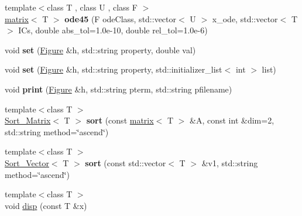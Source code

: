 \begin{DoxyCompactItemize}
\item 
\hypertarget{namespacekeycpp_a880f7df231a78f912b3fb5d301c809f9}{{\footnotesize template$<$class T , class U , class F $>$ }\\\hyperlink{classkeycpp_1_1matrix}{matrix}$<$ T $>$ {\bfseries ode45} (F ode\-Class, std\-::vector$<$ U $>$ x\-\_\-ode, std\-::vector$<$ T $>$ I\-Cs, double abs\-\_\-tol=1.\-0e-\/10, double rel\-\_\-tol=1.\-0e-\/6)}\label{namespacekeycpp_a880f7df231a78f912b3fb5d301c809f9}

\item 
\hypertarget{namespacekeycpp_afcd6ae07fc18f5374868fe314f00108c}{void {\bfseries set} (\hyperlink{classkeycpp_1_1_figure}{Figure} \&h, std\-::string property, double val)}\label{namespacekeycpp_afcd6ae07fc18f5374868fe314f00108c}

\item 
\hypertarget{namespacekeycpp_a261a9d83dcc8786777d193575b7e1a1c}{void {\bfseries set} (\hyperlink{classkeycpp_1_1_figure}{Figure} \&h, std\-::string property, std\-::initializer\-\_\-list$<$ int $>$ list)}\label{namespacekeycpp_a261a9d83dcc8786777d193575b7e1a1c}

\item 
\hypertarget{namespacekeycpp_af9dec3da4533a1db21a6c6c4fe8e740a}{void {\bfseries print} (\hyperlink{classkeycpp_1_1_figure}{Figure} \&h, std\-::string pterm, std\-::string pfilename)}\label{namespacekeycpp_af9dec3da4533a1db21a6c6c4fe8e740a}

\item 
\hypertarget{namespacekeycpp_aa2641f24e5cec5eddddbd6de2159055f}{{\footnotesize template$<$class T $>$ }\\\hyperlink{structkeycpp_1_1_sort___matrix}{Sort\-\_\-\-Matrix}$<$ T $>$ {\bfseries sort} (const \hyperlink{classkeycpp_1_1matrix}{matrix}$<$ T $>$ \&A, const int \&dim=2, std\-::string method=\char`\"{}ascend\char`\"{})}\label{namespacekeycpp_aa2641f24e5cec5eddddbd6de2159055f}

\item 
\hypertarget{namespacekeycpp_adba3dbd0ed8ce919ffcd445bcf273673}{{\footnotesize template$<$class T $>$ }\\\hyperlink{structkeycpp_1_1_sort___vector}{Sort\-\_\-\-Vector}$<$ T $>$ {\bfseries sort} (const std\-::vector$<$ T $>$ \&v1, std\-::string method=\char`\"{}ascend\char`\"{})}\label{namespacekeycpp_adba3dbd0ed8ce919ffcd445bcf273673}

\item 
\hypertarget{namespacekeycpp_a6a8a286886d48471685b18b7782f1e4a}{{\footnotesize template$<$class T $>$ }\\void \hyperlink{namespacekeycpp_a6a8a286886d48471685b18b7782f1e4a}{disp} (const T \&x)}\label{namespacekeycpp_a6a8a286886d48471685b18b7782f1e4a}


\end{DoxyCompactItemize}

